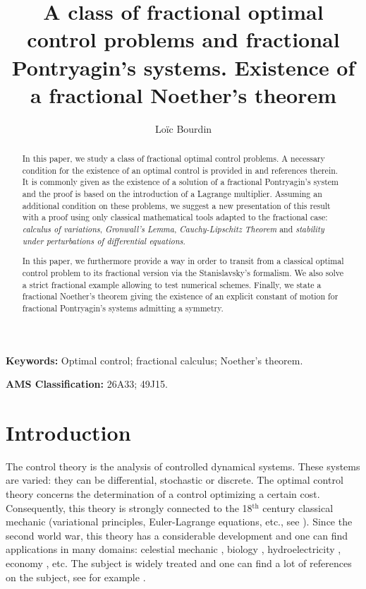 \documentclass[english,11pt,reqno]{smfart}
\begin{document}
\title[]{\textbf{A class of fractional optimal control problems and fractional Pontryagin's systems. Existence of a fractional Noether's theorem}}
\author{Lo\"ic Bourdin}
\address{Laboratoire de Math\'ematiques et de leurs Applications - Pau (LMAP). UMR CNRS 5142. Universit\'e de Pau et des Pays de l'Adour.}
\maketitle

\begin{abstract}
In this paper, we study a class of fractional optimal control problems. A necessary condition for the existence of an optimal control is provided in \cite{agra2,agra3,torr,torr2,jeli} and references therein. It is commonly given as the existence of a solution of a fractional Pontryagin's system and the proof is based on the introduction of a Lagrange multiplier. Assuming an additional condition on these problems, we suggest a new presentation of this result with a proof using only classical mathematical tools adapted to the fractional case: \textit{calculus of variations}, \textit{Gronwall's Lemma}, \textit{Cauchy-Lipschitz Theorem} and \textit{stability under perturbations of differential equations}.

In this paper, we furthermore provide a way in order to transit from a classical optimal control problem to its fractional version via the Stanislavsky's formalism. We also solve a strict fractional example allowing to test numerical schemes. Finally, we state a fractional Noether's theorem giving the existence of an explicit constant of motion for fractional Pontryagin's systems admitting a symmetry.
\end{abstract}

\textbf{\textrm{Keywords:}} Optimal control; fractional calculus; Noether's theorem.

\textbf{\textrm{AMS Classification:}} 26A33; 49J15.

\section*{Introduction}
The control theory is the analysis of controlled dynamical systems. These systems are varied: they can be differential, stochastic or discrete. The optimal control theory concerns the determination of a control optimizing a certain cost. Consequently, this theory is strongly connected to the 18${}^{\text{th}}$ century classical mechanic (variational principles, Euler-Lagrange equations, etc., see \cite{arno,gamk,mart}). Since the second world war, this theory has a considerable development and one can find applications in many domains: celestial mechanic \cite{trel2}, biology \cite{burl}, hydroelectricity \cite{cant}, economy \cite{dema,dmit,fedo}, etc. The subject is widely treated and one can find a lot of references on the subject, see for example \cite{brys,evan,hest,trel}. 
\end{document}
